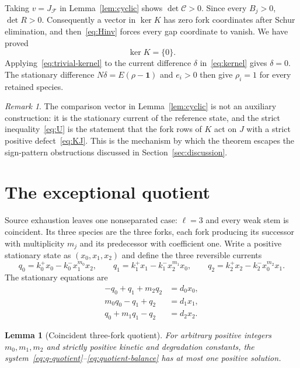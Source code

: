 \documentclass[11pt,reqno]{amsart}
\theoremstyle{plain}
\newtheorem{lemma}[theorem]{Lemma}
\theoremstyle{definition}
\theoremstyle{remark}
\newtheorem{remark}[theorem]{Remark}
\numberwithin{equation}{section}
\newcommand{\one}{\mathbf{1}}
\newcommand{\Ker}{\operatorname{ker}}
\begin{document}
Taking $v=J_{\mathcal F}$ in Lemma~\ref{lem:cyclic} shows $\det\mathcal C>0$.  Since every $B_j>0$, $\det R>0$.  Consequently a vector in $\Ker K$ has zero fork coordinates after Schur elimination, and then~\eqref{eq:Hinv} forces every gap coordinate to vanish.  We have proved
\begin{equation}\label{eq:trivial-kernel}
\Ker K=\{0\} .
\end{equation}
Applying~\eqref{eq:trivial-kernel} to the current difference $\delta$ in~\eqref{eq:kernel} gives $\delta=0$.  The stationary difference $N\delta=E(\rho-\one)$ and $e_i>0$ then give $\rho_i=1$ for every retained species.

\begin{remark}
The comparison vector in Lemma~\ref{lem:cyclic} is not an auxiliary construction: it is the stationary current of the reference state, and the strict inequality~\eqref{eq:U} is the statement that the fork rows of $K$ act on $J$ with a strict positive defect~\eqref{eq:KJ}.  This is the mechanism by which the theorem escapes the sign-pattern obstructions discussed in Section~\ref{sec:discussion}.
\end{remark}

\section{The exceptional quotient}\label{sec:quotient}

Source exhaustion leaves one nonseparated case: $\ell=3$ and every weak stem is coincident.  Its three species are the three forks, each fork producing its successor with multiplicity $m_j$ and its predecessor with coefficient one.  Write a positive stationary state as $(x_0,x_1,x_2)$ and define the three reversible currents
\begin{equation}\label{eq:q-quotient}
q_0=k_0^+x_0-k_0^-x_1^{m_0}x_2,\qquad
q_1=k_1^+x_1-k_1^-x_2^{m_1}x_0,\qquad
q_2=k_2^+x_2-k_2^-x_0^{m_2}x_1 .
\end{equation}
The stationary equations are
\begin{equation}\label{eq:quotient-balance}
\begin{aligned}
-q_0+q_1+m_2q_2&=d_0x_0,\\
m_0q_0-q_1+q_2&=d_1x_1,\\
q_0+m_1q_1-q_2&=d_2x_2 .
\end{aligned}
\end{equation}

\begin{lemma}[Coincident three-fork quotient]\label{lem:quotient}
For arbitrary positive integers $m_0,m_1,m_2$ and strictly positive kinetic and degradation constants, the system~\eqref{eq:q-quotient}--\eqref{eq:quotient-balance} has at most one positive solution.
\end{lemma}
\end{document}
